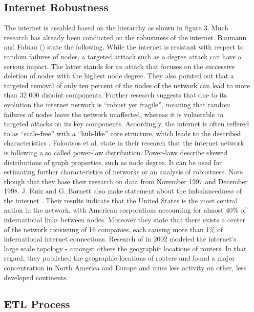 \documentclass[conference, 11pt]{IEEEtran}
\begin{document}
\subsection{Internet Robustness}
The internet is assabled based on the hierarchy as shown in figure 3. Much research has already been conducted on the robustness of the internet. 
Baumann and Fabian (\cite{howRobust}) state the following. While the internet is resistant with respect to random failures of nodes, a targeted atttack such as a degree attack can have a serious impact. The latter stands for an attack that focuses on the successive deletion of nodes with the highest node degree. They also pointed out that a targeted removal of only ten percent of the nodes of the network can lead to more than 32 000 disjoint components. Further research suggests that due to its evolution the internet network  is ``robust yet fragile''\cite{RYF}, meaning that random failures of nodes leave the network unaffected, whereas it is vulnerable to targeted attacks on its key components. Acoordingly, the internet is often reffered to as ``scale-free'' with a ``hub-like'' core structure, which leads to the described characteristics \cite{RYF}. Faloutsos et al. \cite{powerlawCitation} state in their research that the internet network is following a so called power-law distribution. Power-laws describe skewed distributions of graph properties, such as node degree. It can be used for estimating further characteristics of networks or an analysis of robustness. Note though that they base their research on data from November 1997 and December 1998. J. Ruiz and G. Barnett also make statement about the imbalancedness of the internet \cite{owningInternet}. Their results indicate that the United States is the most central nation in the network, with American corporations accounting for almost 40\% of international links between nodes. Moreover they state that there exists a center of the network consisting of 16 companies, each causing more than 1\% of international internet connections.  
Research of \cite{geoResearch} in 2002 modeled the internet's large scale topology - amongst others the geographic locations of routers. In that regard, they published the geographic locations of routers and found a major concentration in North America and Europe and muss less activity on other, less developed continents.   
 


\subsection{ETL Process}
\end{document}
